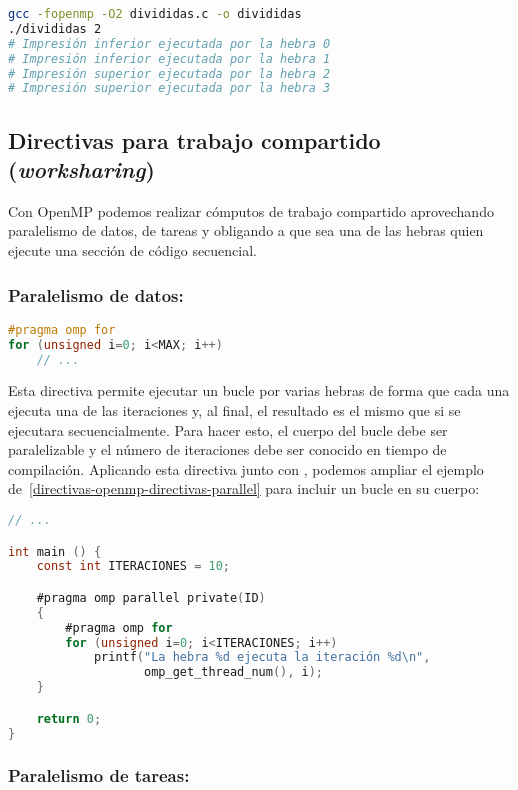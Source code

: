 \begin{lstlisting}[language=sh]
gcc -fopenmp -O2 divididas.c -o divididas
./divididas 2
# Impresión inferior ejecutada por la hebra 0
# Impresión inferior ejecutada por la hebra 1
# Impresión superior ejecutada por la hebra 2
# Impresión superior ejecutada por la hebra 3
\end{lstlisting}

\subsection{Directivas para trabajo compartido (\textit{worksharing})}\label{directivas-openmp-directivas-trabajo-compartido}

Con OpenMP podemos realizar cómputos de trabajo compartido aprovechando paralelismo de datos, de tareas y obligando a que sea una de las hebras quien ejecute una sección de código secuencial.

\subsubsection{Paralelismo de datos: }

\begin{lstlisting}[language=C]
#pragma omp for
for (unsigned i=0; i<MAX; i++)
	// ...
\end{lstlisting}

Esta directiva permite ejecutar un bucle  por varias hebras de forma que cada una ejecuta una de las iteraciones y, al final, el resultado es el mismo que si se ejecutara secuencialmente.
Para hacer esto, el cuerpo del bucle debe ser paralelizable y el número de iteraciones debe ser conocido en tiempo de compilación.
Aplicando esta directiva junto con , podemos ampliar el ejemplo de~\ref{directivas-openmp-directivas-parallel} para incluir un bucle en su cuerpo:

\begin{lstlisting}[language=C]
// ...

int main () {
	const int ITERACIONES = 10;

	#pragma omp parallel private(ID)
	{
		#pragma omp for
		for (unsigned i=0; i<ITERACIONES; i++)
			printf("La hebra %d ejecuta la iteración %d\n",
			       omp_get_thread_num(), i);
	}

	return 0;
}
\end{lstlisting}

\subsubsection{Paralelismo de tareas: }


